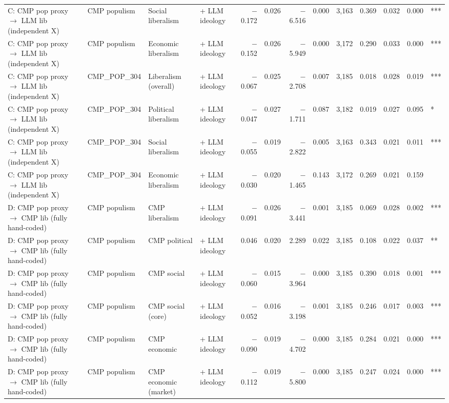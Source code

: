 \begin{table}[ht]
{\begin{tabular}{llllrrrrrrrrl}
C: CMP pop proxy $\rightarrow$ LLM lib (independent X) & CMP populism & Social liberalism & + LLM ideology & $-$0.172 & 0.026 & $-$6.516 & 0.000 & 3,163 & 0.369 & 0.032 & 0.000 & *** \\
C: CMP pop proxy $\rightarrow$ LLM lib (independent X) & CMP populism & Economic liberalism & + LLM ideology & $-$0.152 & 0.026 & $-$5.949 & 0.000 & 3,172 & 0.290 & 0.033 & 0.000 & *** \\
C: CMP pop proxy $\rightarrow$ LLM lib (independent X) & CMP\_POP\_304 & Liberalism (overall) & + LLM ideology & $-$0.067 & 0.025 & $-$2.708 & 0.007 & 3,185 & 0.018 & 0.028 & 0.019 & *** \\
C: CMP pop proxy $\rightarrow$ LLM lib (independent X) & CMP\_POP\_304 & Political liberalism & + LLM ideology & $-$0.047 & 0.027 & $-$1.711 & 0.087 & 3,182 & 0.019 & 0.027 & 0.095 & * \\
C: CMP pop proxy $\rightarrow$ LLM lib (independent X) & CMP\_POP\_304 & Social liberalism & + LLM ideology & $-$0.055 & 0.019 & $-$2.822 & 0.005 & 3,163 & 0.343 & 0.021 & 0.011 & *** \\
C: CMP pop proxy $\rightarrow$ LLM lib (independent X) & CMP\_POP\_304 & Economic liberalism & + LLM ideology & $-$0.030 & 0.020 & $-$1.465 & 0.143 & 3,172 & 0.269 & 0.021 & 0.159 &  \\
D: CMP pop proxy $\rightarrow$ CMP lib (fully hand-coded) & CMP populism & CMP liberalism & + LLM ideology & $-$0.091 & 0.026 & $-$3.441 & 0.001 & 3,185 & 0.069 & 0.028 & 0.002 & *** \\
D: CMP pop proxy $\rightarrow$ CMP lib (fully hand-coded) & CMP populism & CMP political & + LLM ideology & 0.046 & 0.020 & 2.289 & 0.022 & 3,185 & 0.108 & 0.022 & 0.037 & ** \\
D: CMP pop proxy $\rightarrow$ CMP lib (fully hand-coded) & CMP populism & CMP social & + LLM ideology & $-$0.060 & 0.015 & $-$3.964 & 0.000 & 3,185 & 0.390 & 0.018 & 0.001 & *** \\
D: CMP pop proxy $\rightarrow$ CMP lib (fully hand-coded) & CMP populism & CMP social (core) & + LLM ideology & $-$0.052 & 0.016 & $-$3.198 & 0.001 & 3,185 & 0.246 & 0.017 & 0.003 & *** \\
D: CMP pop proxy $\rightarrow$ CMP lib (fully hand-coded) & CMP populism & CMP economic & + LLM ideology & $-$0.090 & 0.019 & $-$4.702 & 0.000 & 3,185 & 0.284 & 0.021 & 0.000 & *** \\
D: CMP pop proxy $\rightarrow$ CMP lib (fully hand-coded) & CMP populism & CMP economic (market) & + LLM ideology & $-$0.112 & 0.019 & $-$5.800 & 0.000 & 3,185 & 0.247 & 0.024 & 0.000 & *** \\

\end{tabular}}
\end{table}
